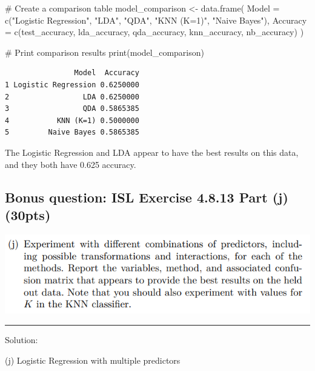 \documentclass[
]{article}
\newenvironment{Shaded}{\begin{snugshade}}{\end{snugshade}}
\newcommand{\AttributeTok}[1]{\textcolor[rgb]{0.40,0.45,0.13}{#1}}
\newcommand{\CommentTok}[1]{\textcolor[rgb]{0.37,0.37,0.37}{#1}}
\newcommand{\FunctionTok}[1]{\textcolor[rgb]{0.28,0.35,0.67}{#1}}
\newcommand{\NormalTok}[1]{\textcolor[rgb]{0.00,0.23,0.31}{#1}}
\newcommand{\OtherTok}[1]{\textcolor[rgb]{0.00,0.23,0.31}{#1}}
\newcommand{\StringTok}[1]{\textcolor[rgb]{0.13,0.47,0.30}{#1}}
\begin{document}
\begin{Shaded}
\begin{Highlighting}[]
\CommentTok{\# Create a comparison table}
\NormalTok{model\_comparison }\OtherTok{\textless{}{-}} \FunctionTok{data.frame}\NormalTok{(}
  \AttributeTok{Model =} \FunctionTok{c}\NormalTok{(}\StringTok{"Logistic Regression"}\NormalTok{, }\StringTok{"LDA"}\NormalTok{, }\StringTok{"QDA"}\NormalTok{, }\StringTok{"KNN (K=1)"}\NormalTok{, }
            \StringTok{"Naive Bayes"}\NormalTok{),}
  \AttributeTok{Accuracy =} \FunctionTok{c}\NormalTok{(test\_accuracy, lda\_accuracy, qda\_accuracy, }
\NormalTok{               knn\_accuracy, nb\_accuracy)}
\NormalTok{)}

\CommentTok{\# Print comparison results}
\FunctionTok{print}\NormalTok{(model\_comparison)}
\end{Highlighting}
\end{Shaded}

\begin{verbatim}
                Model  Accuracy
1 Logistic Regression 0.6250000
2                 LDA 0.6250000
3                 QDA 0.5865385
4           KNN (K=1) 0.5000000
5         Naive Bayes 0.5865385
\end{verbatim}

The Logistic Regression and LDA appear to have the best results on this
data, and they both have 0.625 accuracy.

\hypertarget{bonus-question-isl-exercise-4.8.13-part-j-30pts}{%
\subsection{Bonus question: ISL Exercise 4.8.13 Part (j)
(30pts)}\label{bonus-question-isl-exercise-4.8.13-part-j-30pts}}

\includegraphics{images/clipboard-698312542.png}

\begin{center}\rule{0.5\linewidth}{0.5pt}\end{center}

Solution:

(j) Logistic Regression with multiple predictors
\end{document}
